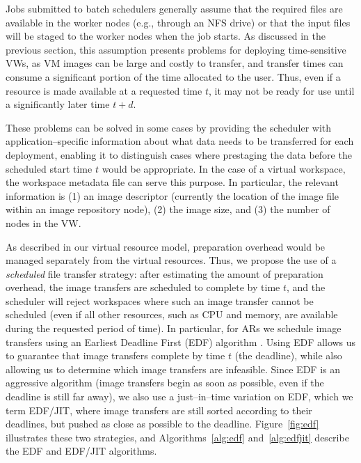 Jobs submitted to batch schedulers generally assume that the required files are available in the worker nodes (e.g., through an NFS drive) or that the input files will be staged to the worker nodes when the job starts. As discussed in the previous section, this assumption presents problems for deploying time{}-sensitive VWs, as VM images can be large and costly to transfer, and transfer times can consume a significant portion of the time allocated to the user. Thus, even if a resource is made available at a requested time $t$, it may not be ready for use until a significantly later time $t+d$.

These problems can be solved in some cases by providing the scheduler with application--specific information about what data needs to be transferred for each deployment, enabling it to distinguish cases where prestaging the data before the scheduled start time $t$ would be appropriate. In the case of a virtual workspace, the workspace metadata file can serve this purpose. In particular, the relevant information is (1) an image descriptor (currently the location of the image file within an image repository node), (2) the image size, and (3) the number of nodes in the VW.

As described in our virtual resource model, preparation overhead would be managed separately from the virtual resources. Thus, we propose the use of a \emph{scheduled} file transfer strategy: after estimating the amount of preparation overhead, the image transfers are scheduled to complete by time $t$, and the scheduler will reject workspaces where such an image transfer cannot be scheduled (even if all other resources, such as CPU and memory, are available during the requested period of time). In particular, for ARs we schedule image transfers using an Earliest Deadline First (EDF) algorithm \cite{BorjaCite22}. Using EDF allows us to guarantee that image transfers complete by time $t$ (the deadline), while also allowing us to determine which image transfers are infeasible. Since EDF is an aggressive algorithm (image transfers begin as soon as possible, even if the deadline is still far away), we also use a just--in--time variation on EDF, which we term EDF/JIT, where image transfers are still sorted according to their deadlines, but pushed as close as possible to the deadline. Figure~\ref{fig:edf} illustrates these two strategies, and Algorithms~\ref{alg:edf} and~\ref{alg:edfjit} describe the EDF and EDF/JIT algorithms.

